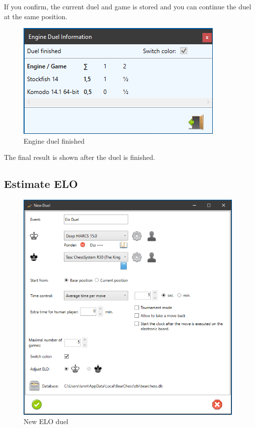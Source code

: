 \documentclass[11pt,a4paper]{article}
\begin{document}
If you confirm, the current duel and game is stored and you can continue the duel at the same position.

\begin{figure}[H]
	\centering
	\includegraphics[scale=1.0]{EngineDuel5.png}
	\caption{Engine duel finished}
	\label{fig:EngineDuel5}
\end{figure}

The final result is shown after the duel is finished.

\subsection{Estimate ELO}

\begin{figure}[H]
	\centering
	\includegraphics[scale=0.7]{EstimateElo1.png}
	\caption{New ELO duel}
	\label{fig:EstimateElo1}
\end{figure}
\end{document}
